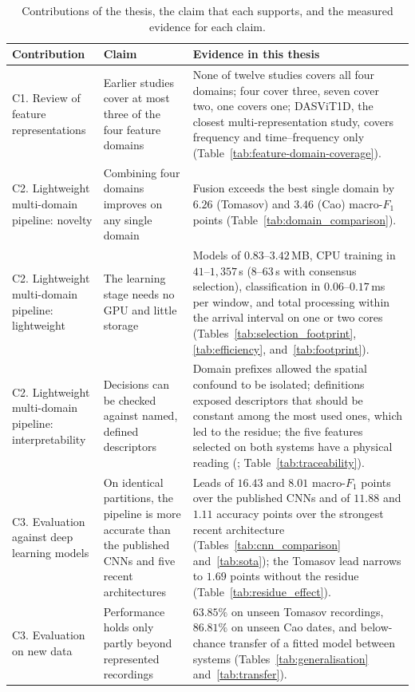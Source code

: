 \begin{table}[!htbp]
	\centering
	\caption[Contributions of the thesis and the evidence for each]{Contributions of the thesis, the claim that each supports, and the measured evidence for each claim.}
	\label{tab:novelty_evidence}
	\footnotesize
	\setlength{\tabcolsep}{4pt}
	\renewcommand{\arraystretch}{1.2}
	\begin{tabularx}{\textwidth}{@{}>{\raggedright\arraybackslash}p{2.6cm} >{\raggedright\arraybackslash}p{3.6cm} >{\raggedright\arraybackslash}X@{}}
		\toprule
		\textbf{Contribution} & \textbf{Claim} & \textbf{Evidence in this thesis}\\
		\midrule
		C1. Review of feature representations & Earlier studies cover at most three of the four feature domains & None of twelve studies covers all four domains; four cover three, seven cover two, one covers one; DASViT1D, the closest multi-representation study, covers frequency and time--frequency only (Table~\ref{tab:feature-domain-coverage}).\\
		\addlinespace[3pt]
		C2. Lightweight multi-domain pipeline: novelty & Combining four domains improves on any single domain & Fusion exceeds the best single domain by $6.26$ (Tomasov) and $3.46$ (Cao) macro-$F_1$ points (Table~\ref{tab:domain_comparison}).\\
		\addlinespace[3pt]
		C2. Lightweight multi-domain pipeline: lightweight & The learning stage needs no GPU and little storage & Models of $0.83$--$3.42$\,MB, CPU training in $41$--$1{,}357$\,s ($8$--$63$\,s with consensus selection), classification in $0.06$--$0.17$\,ms per window, and total processing within the arrival interval on one or two cores (Tables~\ref{tab:selection_footprint}, \ref{tab:efficiency}, and~\ref{tab:footprint}).\\
		\addlinespace[3pt]
		C2. Lightweight multi-domain pipeline: interpretability & Decisions can be checked against named, defined descriptors & Domain prefixes allowed the spatial confound to be isolated; definitions exposed descriptors that should be constant among the most used ones, which led to the residue; the five features selected on both systems have a physical reading ({sec:resWhiteBox}; Table~\ref{tab:traceability}).\\
		\addlinespace[3pt]
		C3. Evaluation against deep learning models & On identical partitions, the pipeline is more accurate than the published CNNs and five recent architectures & Leads of $16.43$ and $8.01$ macro-$F_1$ points over the published CNNs and of $11.88$ and $1.11$ accuracy points over the strongest recent architecture (Tables~\ref{tab:cnn_comparison} and~\ref{tab:sota}); the Tomasov lead narrows to $1.69$ points without the residue (Table~\ref{tab:residue_effect}).\\
		\addlinespace[3pt]
		C3. Evaluation on new data & Performance holds only partly beyond represented recordings & $63.85\%$ on unseen Tomasov recordings, $86.81\%$ on unseen Cao dates, and below-chance transfer of a fitted model between systems (Tables~\ref{tab:generalisation} and~\ref{tab:transfer}).\\
		\bottomrule
	\end{tabularx}
\end{table}

